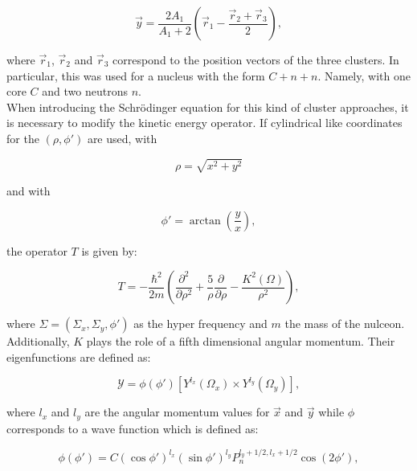 \documentclass[openany]{book}
\begin{document}
\begin{equation}\label{eq:micro_cluster_breakup_jacobi_y}
	\vec y = \frac{2A_1}{A_1 + 2} \left ( \vec r_1  - \frac{\vec r_2 + \vec r_3}{2} \right),
\end{equation}

where $\vec r_1$, $\vec r_2$ and $\vec r_3$ correspond to the position vectors of the three clusters. In particular, this was used for a nucleus with the form $C + n + n$. Namely, with one core $C$ and two neutrons $n$. \\

When introducing the Schrödinger equation for this kind of cluster approaches, it is necessary to modify the kinetic energy operator. If cylindrical like coordinates for the  $(\rho, \phi')$ are used, with 

\begin{equation}\label{eq:micro_cluster_breakup_rho}
	\rho = \sqrt{x^2 + y^2}
\end{equation}

and with 

\begin{equation}\label{eq:micro_cluster_breakup_phi}
	\phi' = \arctan \left( \frac{y}{x}\right),
\end{equation}

the operator  $T$ is given by:

\begin{equation}\label{eq:micro_cluster_breakup_kinetic}
	T = -\frac{\hbar^2}{2m} \left( \frac{\partial^2}{\partial \rho^2}  + \frac{5}{\rho} \frac{\partial }{\partial \rho} - \frac{K^2(\Omega)}{\rho^2}\right),
\end{equation} 

where $\Sigma = (\Sigma_x, \Sigma_y, \phi')$ as the hyper frequency and $m$ the mass of the nulceon. Additionally, $K$ plays the role of a fifth dimensional angular momentum. Their eigenfunctions are defined as: 

\begin{equation}\label{eq:micro_cluster_breakup_hyperspherical}
	\mathcal{Y} = \phi (\phi') [Y^{l_x}(\Omega_x) \times Y^{l_y} (\Omega_y)],
\end{equation}

where $l_x$ and $l_y$ are the angular momentum values for $\vec x$ and $\vec y$ while $\phi$ corresponds to a wave function which is defined as: 

\begin{equation}\label{eq:micro_cluster_breakup_wavefunction}
	\phi(\phi')  = C (\cos \phi')^{l_x}   (\sin \phi')^{l_y} P_n^{l_y + 1/2, l_x + 1/2} \cos (2\phi'),
\end{equation}
\end{document}
